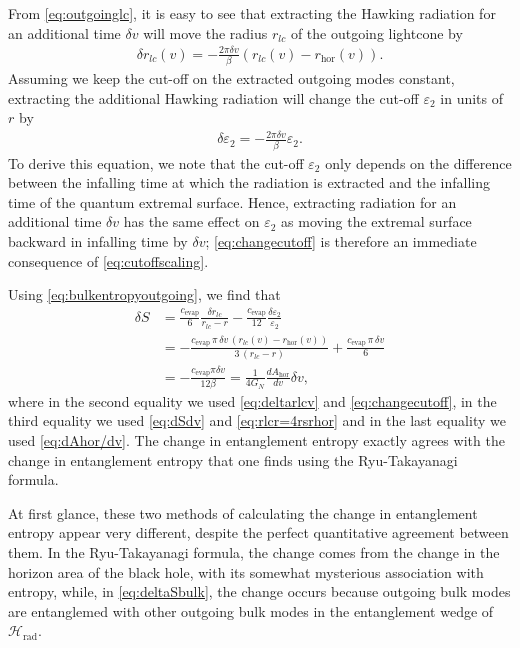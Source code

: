 \documentclass[11pt,a4paper]{article}
\begin{document}
From \eqref{eq:outgoinglc}, it is easy to see that extracting the Hawking radiation for an additional time $\delta v$ will move the radius $r_{lc}$ of the outgoing lightcone by
\begin{align} \label{eq:deltarlcv}
\delta r_{lc}(v) = - \frac{2 \pi \delta v}{\beta} (r_{lc}(v) - r_\text{hor}(v)).
\end{align}
Assuming we keep the cut-off on the extracted outgoing modes constant, extracting the additional Hawking radiation will change the cut-off $\varepsilon_2$ in units of $r$ by
\begin{align} \label{eq:changecutoff}
\delta \varepsilon_2 = -\frac{2 \pi \delta v}{\beta} \varepsilon_2.
\end{align}
To derive this equation, we note that the cut-off $\varepsilon_2$ only depends on the difference between the infalling time at which the radiation is extracted and the infalling time of the quantum extremal surface. Hence, extracting radiation for an additional time $\delta v$ has the same effect on $\varepsilon_2$ as moving the extremal surface backward in infalling time by $\delta v$; \eqref{eq:changecutoff} is therefore an immediate consequence of \eqref{eq:cutoffscaling}.

Using \eqref{eq:bulkentropyoutgoing}, we find that
\begin{align} \label{eq:deltaSbulk}
\delta S &= \frac{c_\text{evap}}{6} \frac{\delta r_{lc}}{r_{lc} - r} - \frac{c_\text{evap}}{12}\frac{\delta \varepsilon_2}{\varepsilon_2}
\\& = -\frac{c_\text{evap}\, \pi\, \delta v\, (r_{lc}(v) - r_\text{hor}(v))}{3\,(r_{lc} - r)} + \frac{c_\text{evap}\, \pi\, \delta v}{6}
\\& = -\frac{c_\text{evap} \pi \delta v}{12 \beta} = \frac{1}{4 G_N}\frac{d A_\text{hor}}{dv} \delta v,
\end{align}
where in the second equality we used \eqref{eq:deltarlcv} and \eqref{eq:changecutoff}, in the third equality we used \eqref{eq:dSdv} and  \eqref{eq:rlcr=4rsrhor} and in the last equality we used \eqref{eq:dAhor/dv}. The change in entanglement entropy exactly agrees with the change in entanglement entropy that one finds using the Ryu-Takayanagi formula. 

At first glance, these two methods of calculating the change in entanglement entropy appear very different, despite the perfect quantitative agreement between them. In the Ryu-Takayanagi formula, the change comes from the change in the horizon area of the black hole, with its somewhat mysterious association with entropy, while, in \eqref{eq:deltaSbulk}, the change occurs because outgoing bulk modes are entanglemed with other outgoing bulk modes in the entanglement wedge of $\mathcal{H}_\text{rad}$. 
\end{document}
